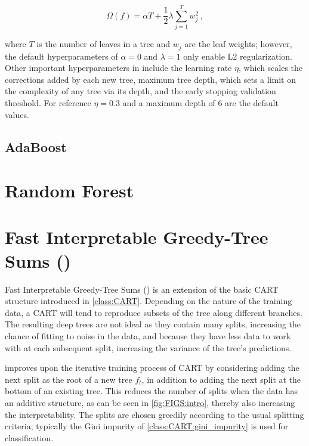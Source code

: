 \begin{equation} \label{eq:bdt_omega_reg}
\Omega\left(f\right) = \alpha T + \frac{1}{2}\lambda \sum_{j=1}^T w_{j}^{2}\,,
\end{equation}

\noindent where $T$ is the number of leaves in a tree and $w_{j}$ are the leaf weights;
however, the default hyperparameters of $\alpha=0$ and $\lambda=1$ only enable L2 regularization.
Other important hyperparameters in \xgboost include the
learning rate $\eta$, which scales the corrections added by each new tree,
maximum tree depth, which sets a limit on the complexity of any tree via its depth,
and the early stopping validation threshold.
For reference $\eta=0.3$ and a maximum depth of 6 are the default values.

\subsection{AdaBoost}
\label{class:BDT:AdaBoost}

\section{Random Forest}
\label{class:RF}


\section{Fast Interpretable Greedy-Tree Sums (\figs)}
\label{class:FIGS}

Fast Interpretable Greedy-Tree Sums (\figs) \cite{FIGS,G-FIGS}
is an extension of the basic CART structure introduced in \cref{class:CART}.
Depending on the nature of the training data,
a CART will tend to reproduce subsets of the tree along different branches.
The resulting deep trees are not ideal as they contain many splits,
increasing the chance of fitting to noise in the data,
and because they have less data to work with at each subsequent split,
increasing the variance of the tree's predictions.

\figs improves upon the iterative training process of CART
by considering adding the next split as the root of a new tree $f_{t}$,
in addition to adding the next split at the bottom of an existing tree.
This reduces the number of splits when the data has an additive structure,
as can be seen in \cref{fig:FIGS:intro}, thereby also increasing the interpretability.
The splits are chosen greedily according to the usual splitting criteria;
typically the Gini impurity of \cref{class:CART:gini_impurity} is used for classification.

